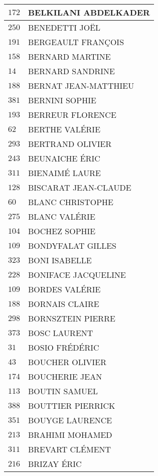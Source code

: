 \begin{xltabular}{\linewidth}{|l|X|}
    $172$ & BELKILANI ABDELKADER \\
    \hline
    $250$ & BENEDETTI JOËL \\
    \hline
    $191$ & BERGEAULT FRANÇOIS \\
    \hline
    $158$ & BERNARD MARTINE \\
    \hline
    $14$ & BERNARD SANDRINE \\
    \hline
    $188$ & BERNAT JEAN-MATTHIEU \\
    \hline
    $381$ & BERNINI SOPHIE \\
    \hline
    $193$ & BERREUR FLORENCE \\
    \hline
    $62$ & BERTHE VALÉRIE \\
    \hline
    $293$ & BERTRAND OLIVIER \\
    \hline
    $243$ & BEUNAICHE ÉRIC \\
    \hline
    $311$ & BIENAIMÉ LAURE \\
    \hline
    $128$ & BISCARAT JEAN-CLAUDE \\
    \hline
    $60$ & BLANC CHRISTOPHE \\
    \hline
    $275$ & BLANC VALÉRIE \\
    \hline
    $104$ & BOCHEZ SOPHIE \\
    \hline
    $109$ & BONDYFALAT GILLES \\
    \hline
    $323$ & BONI ISABELLE \\
    \hline
    $228$ & BONIFACE JACQUELINE \\
    \hline
    $109$ & BORDES VALÉRIE \\
    \hline
    $188$ & BORNAIS CLAIRE \\
    \hline
    $298$ & BORNSZTEIN PIERRE \\
    \hline
    $373$ & BOSC LAURENT \\
    \hline
    $31$ & BOSIO FRÉDÉRIC \\
    \hline
    $43$ & BOUCHER OLIVIER \\
    \hline
    $174$ & BOUCHERIE JEAN \\
    \hline
    $113$ & BOUTIN SAMUEL \\
    \hline
    $388$ & BOUTTIER PIERRICK \\
    \hline
    $351$ & BOUYGE LAURENCE \\
    \hline
    $213$ & BRAHIMI MOHAMED \\
    \hline
    $311$ & BREVART CLÉMENT \\
    \hline
    $216$ & BRIZAY ÉRIC \\

\end{xltabular}
